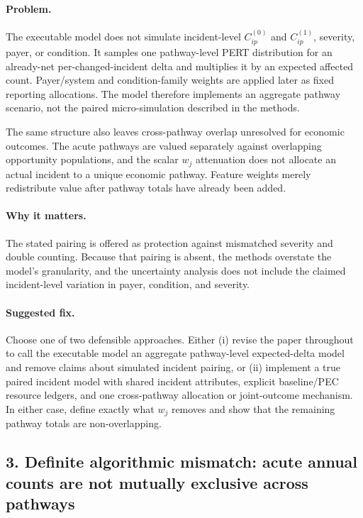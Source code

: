 \documentclass[11pt]{article}
\begin{document}
\paragraph{Problem.}
The executable model does not simulate incident-level
\(C_{ip}^{(0)}\) and \(C_{ip}^{(1)}\), severity, payer, or condition.  It samples
one pathway-level PERT distribution for an already-net per-changed-incident
delta and multiplies it by an expected affected count.  Payer/system and
condition-family weights are applied later as fixed reporting allocations.
The model therefore implements an aggregate pathway scenario, not the paired
micro-simulation described in the methods.

The same structure also leaves cross-pathway overlap unresolved for economic
outcomes.  The acute pathways are valued separately against overlapping
opportunity populations, and the scalar \(w_j\) attenuation does not allocate
an actual incident to a unique economic pathway.  Feature weights merely
redistribute value after pathway totals have already been added.

\paragraph{Why it matters.}
The stated pairing is offered as protection against mismatched severity and
double counting.  Because that pairing is absent, the methods overstate the
model's granularity, and the uncertainty analysis does not include the claimed
incident-level variation in payer, condition, and severity.

\paragraph{Suggested fix.}
Choose one of two defensible approaches.  Either (i) revise the paper throughout
to call the executable model an aggregate pathway-level expected-delta model
and remove claims about simulated incident pairing, or (ii) implement a true
paired incident model with shared incident attributes, explicit baseline/PEC
resource ledgers, and one cross-pathway allocation or joint-outcome mechanism.
In either case, define exactly what \(w_j\) removes and show that the remaining
pathway totals are non-overlapping.

\subsection*{3. Definite algorithmic mismatch: acute annual counts are not mutually exclusive across pathways}
\end{document}
